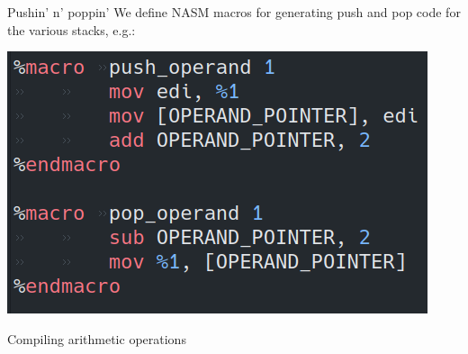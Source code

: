 \documentclass{beamer}
\begin{document}
 \begin{frame}{Pushin' n' poppin'}
We define NASM macros for generating push and pop code for the various stacks, e.g.:
 \begin{center}
   \includegraphics[scale = .7]{pushpop}
  \end{center}
 \end{frame}

\begin{frame}{Compiling arithmetic operations}

\end{frame}
\end{document}
